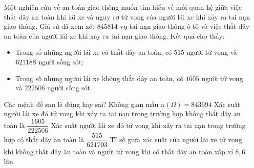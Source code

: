 \begin{ex}%
	Một nghiên cứu về an toàn giao thông muốn tìm hiểu về mối quan hệ giữa việc thắt dây an toàn khi lái xe và nguy cơ tử vong của người lái xe khi xảy ra tai nạn giao thông. Giả sử đã xem xét $845814$ vụ tai nạn giao thông ô tô và việc thắt dây an toàn của người lái xe khi xảy ra tai nạn giao thông. Kết quả cho thấy:
	\begin{itemize}
		\item Trong số những người lái xe có thắt dây an toàn, có $515$ người tử vong và $621188$ người sống sót;
		\item Trong số những người lái xe không thắt dây an toàn, có $1605$ người tử vong và $222506$ người sống sót.
	\end{itemize}
	Các mệnh đề sau là đúng hay sai?
	\choiceTF
	{Không gian mẫu $n(\Omega) = 843694$}
	{Xác suất người lái xe đó tử vong khi xảy ra tai nạn trong trường hợp không thắt dây an toàn là $\dfrac{1605}{222506}$}
	{\True Xác suất người lái xe đó tử vong khi xảy ra tai nạn trong trường hợp có thắt dây an toàn là $\dfrac{515}{621703}$}
	{\True Tỉ số giữa xác suất của người lái xe tử vong khi không thắt dây ăn toàn và người tử vong khi có thắt dây an toàn xấp xỉ $8{,}6$ lần}
\end{ex}

